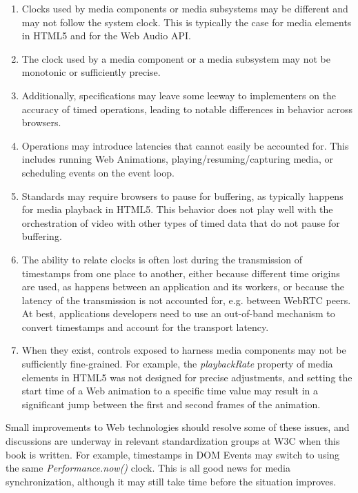 \documentclass[graybox]{svmult}
\begin{document}
\begin{enumerate}

\item{
Clocks used by media components or media subsystems may be different and may
not follow the system clock. This is typically the case for media elements in
HTML5 and for the Web Audio API.
}

\item{
The clock used by a media component or a media subsystem may not be monotonic
or sufficiently precise.
}

\item{
Additionally, specifications may leave some leeway to implementers on the
accuracy of timed operations, leading to notable differences in behavior
across browsers.
}

\item{
Operations may introduce latencies that cannot easily be accounted for. This
includes running Web Animations, playing/resuming/capturing media, or
scheduling events on the event loop.
}

\item{
Standards may require browsers to pause for buffering, as typically
happens for media playback in HTML5. This behavior does not play well with the
orchestration of video with other types of timed data that do not pause for
buffering.
}

\item{ The ability to relate clocks is often lost during the transmission of
timestamps from one place to another, either because different time origins
are used, as happens between an application and its workers, or because the
latency of the transmission is not accounted for, e.g. between WebRTC peers.
At best, applications developers need to use an out-of-band mechanism to
convert timestamps and account for the transport latency. }

\item{
When they exist, controls exposed to harness media components may not be
sufficiently fine-grained. For example, the \emph{playbackRate} property of media
elements in HTML5 was not designed for precise adjustments, and setting the
start time of a Web animation to a specific time value may result in a
significant jump between the first and second frames of the animation.
}

\end{enumerate}

Small improvements to Web technologies should resolve some of these issues,
and discussions are underway in relevant standardization groups at W3C when
this book is written. For example, timestamps in DOM Events may
switch to using the same \emph{Performance.now()} clock. This is all good news for
media synchronization, although it may still take time before the situation
improves.
\end{document}
